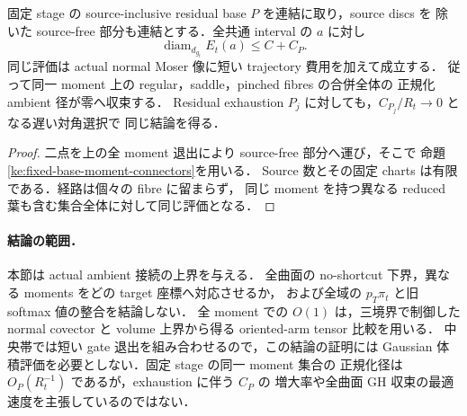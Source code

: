 \begin{corollary}
\label{ke:source-inclusive-same-moment-collapse}
固定 stage の source-inclusive residual base $P$ を連結に取り，source discs を
除いた source-free 部分も連結とする．全共通 interval の $a$ に対し
\[
 \operatorname{diam}_{d_{g_t}}E_t(a)
 \le C+C_P.
\]
同じ評価は actual normal Moser 像に短い trajectory 費用を加えて成立する．
従って同一 moment 上の regular，saddle，pinched fibres の合併全体の
正規化 ambient 径が零へ収束する．
Residual exhaustion $P_j$ に対しても，$C_{P_j}/R_t\to0$ となる遅い対角選択で
同じ結論を得る．
\end{corollary}

\begin{proof}
二点を上の全 moment 退出により source-free 部分へ運び，そこで
命題\ref{ke:fixed-base-moment-connectors}を用いる．
Source 数とその固定 charts は有限である．経路は個々の fibre に留まらず，
同じ moment を持つ異なる reduced 葉も含む集合全体に対して同じ評価となる．
\end{proof}

\paragraph{結論の範囲．}
本節は actual ambient 接続の上界を与える．
全曲面の no-shortcut 下界，異なる moments をどの target 座標へ対応させるか，
および全域の $p_T\pi_t$ と旧 softmax 値の整合を結論しない．
全 moment での $O(1)$ は，三境界で制御した normal covector と
volume 上界から得る oriented-arm tensor 比較を用いる．
中央帯では短い gate 退出を組み合わせるので，この結論の証明には
Gaussian 体積評価を必要としない．固定 stage の同一 moment 集合の
正規化径は $O_P(R_t^{-1})$ であるが，exhaustion に伴う $C_P$ の
増大率や全曲面 GH 収束の最適速度を主張しているのではない．

